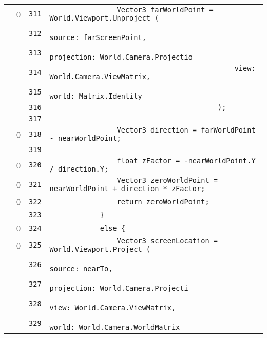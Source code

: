 \documentclass[a4paper,10pt]{article}
\begin{document}
\begin{longtable}[l]{lrrl}
\cellcolor{red} & 0 & \verb~311~ & \verb~                Vector3 farWorldPoint = World.Viewport.Unproject (~\\
\cellcolor{gray} &  & \verb~312~ & \verb~                                            source: farScreenPoint,~\\
\cellcolor{gray} &  & \verb~313~ & \verb~                                            projection: World.Camera.Projectio~\\
\cellcolor{gray} &  & \verb~314~ & \verb~                                            view: World.Camera.ViewMatrix,~\\
\cellcolor{gray} &  & \verb~315~ & \verb~                                            world: Matrix.Identity~\\
\cellcolor{gray} &  & \verb~316~ & \verb~                                        );~\\
\cellcolor{gray} &  & \verb~317~ & \verb~~\\
\cellcolor{red} & 0 & \verb~318~ & \verb~                Vector3 direction = farWorldPoint - nearWorldPoint;~\\
\cellcolor{gray} &  & \verb~319~ & \verb~~\\
\cellcolor{red} & 0 & \verb~320~ & \verb~                float zFactor = -nearWorldPoint.Y / direction.Y;~\\
\cellcolor{red} & 0 & \verb~321~ & \verb~                Vector3 zeroWorldPoint = nearWorldPoint + direction * zFactor;~\\
\cellcolor{red} & 0 & \verb~322~ & \verb~                return zeroWorldPoint;~\\
\cellcolor{gray} &  & \verb~323~ & \verb~            }~\\
\cellcolor{red} & 0 & \verb~324~ & \verb~            else {~\\
\cellcolor{red} & 0 & \verb~325~ & \verb~                Vector3 screenLocation = World.Viewport.Project (~\\
\cellcolor{gray} &  & \verb~326~ & \verb~                                             source: nearTo,~\\
\cellcolor{gray} &  & \verb~327~ & \verb~                                             projection: World.Camera.Projecti~\\
\cellcolor{gray} &  & \verb~328~ & \verb~                                             view: World.Camera.ViewMatrix,~\\
\cellcolor{gray} &  & \verb~329~ & \verb~                                             world: World.Camera.WorldMatrix~\\

\end{longtable}
\end{document}
